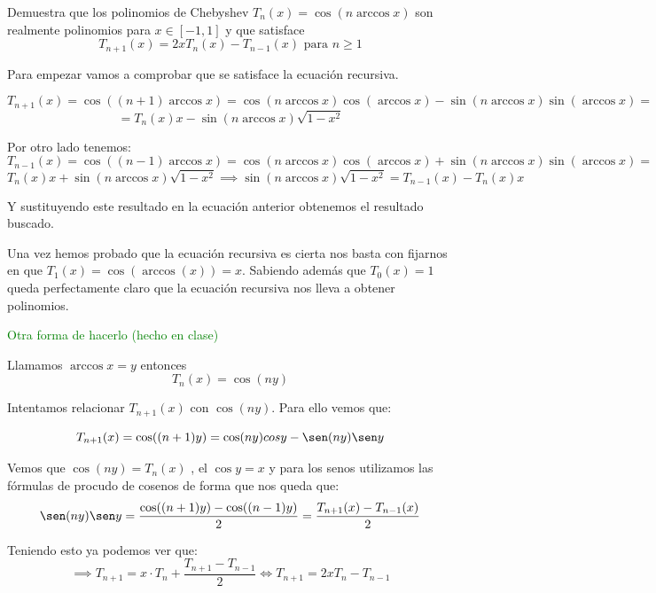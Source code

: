 \begin{problem}[9]
Demuestra que los polinomios de Chebyshev $T_n(x)=\cos(n \arccos x)$ son realmente polinomios para $x \in [-1,1]$ y que satisface
\[T_{n+1}(x)=2xT_n(x)-T_{n-1}(x) \text{ para } n \geq 1\]
\solution

\yoP

Para empezar vamos a comprobar que se satisface la ecuación recursiva.

\[T_{n+1}(x)=\cos((n+1)\arccos x) = \cos(n\arccos x)\cos(\arccos x)-\sin(n \arccos x)\sin(\arccos x) =\]
\[=T_n(x)x-\sin(n \arccos x)\sqrt{1-x^2}\]

Por otro lado tenemos:
\[T_{n-1}(x)=\cos((n-1)\arccos x) = \cos(n\arccos x)\cos(\arccos x)+\sin(n \arccos x)\sin(\arccos x) =\]
\[T_n(x)x+\sin(n \arccos x)\sqrt{1-x^2} \implies \sin(n \arccos x)\sqrt{1-x^2} =T_{n-1}(x)-T_n(x)x\]

Y sustituyendo este resultado en la ecuación anterior obtenemos el resultado buscado.

Una vez hemos probado que la ecuación recursiva es cierta nos basta con fijarnos en que $T_1(x)=\cos(\arccos(x))=x$. Sabiendo además que $T_0(x)=1$ queda perfectamente claro que la ecuación recursiva nos lleva a obtener polinomios.

\textcolor{green}{Otra forma de hacerlo (hecho en clase)}


Llamamos $\arccos x = y$ entonces
$$T_n(x) = \cos (ny)$$

Intentamos relacionar $T_{n+1}(x)$ con $\cos(ny)$. Para ello vemos que:

$$T_{n+1}(x) = \cos((n+1)y) = \cos(ny) cos y - \sen(ny) \sen y$$

Vemos que $\cos(ny) = T_n(x)$ , el $\cos y= x$ y para los senos utilizamos las fórmulas de procudo de cosenos de forma que nos queda que:
$$ \sen(ny) \sen y = \frac{\cos((n+1)y) - \cos((n-1)y)}{2} = \frac{T_{n+1}(x) - T_{n-1}(x)}{2}$$

Teniendo esto ya podemos ver que:
$$\implies T_{n+1}= x\cdot T_n + \frac{T_{n+1} - T_{n-1}}{2} \iff T_{n+1} = 2xT_n - T_{n-1}$$

\end{problem}

